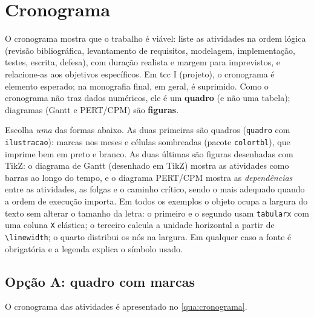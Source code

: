 \chapter{Cronograma}\label{sec:cronograma}

\begin{dica}
O cronograma mostra que o trabalho é viável: liste as atividades na ordem lógica
(revisão bibliográfica, levantamento de requisitos, modelagem, implementação, testes,
escrita, defesa), com duração realista e margem para imprevistos, e relacione-as aos
objetivos específicos. Em \ac{tcc} I (projeto), o cronograma é elemento esperado; na
monografia final, em geral, é suprimido. Como o cronograma não traz dados numéricos,
ele é um \textbf{quadro} (e não uma tabela); diagramas (Gantt e PERT/CPM) são
\textbf{figuras}.
\end{dica}

\begin{dica}
Escolha \emph{uma} das formas abaixo. As duas primeiras são quadros (\texttt{quadro} com
\texttt{ilustracao}): marcas nos meses e células sombreadas (pacote \texttt{colortbl}), que
imprime bem em preto e branco. As duas últimas são figuras desenhadas com TikZ: o diagrama
de Gantt (desenhado em TikZ) mostra as atividades como barras ao longo do tempo, e
o diagrama PERT/CPM mostra as \emph{dependências} entre as atividades, as folgas e o caminho
crítico, sendo o mais adequado quando a ordem de execução importa. Em todos os exemplos o
objeto ocupa a largura do texto sem alterar o tamanho da letra: o primeiro e o segundo usam
\texttt{tabularx} com uma coluna \texttt{X} elástica; o terceiro calcula a unidade horizontal
a partir de \texttt{\textbackslash linewidth}; o quarto distribui os nós na largura. Em
qualquer caso a fonte é obrigatória e a legenda explica o símbolo usado.
\end{dica}

\section{Opção A: quadro com marcas}

O cronograma das atividades é apresentado no \autoref{qua:cronograma}.

